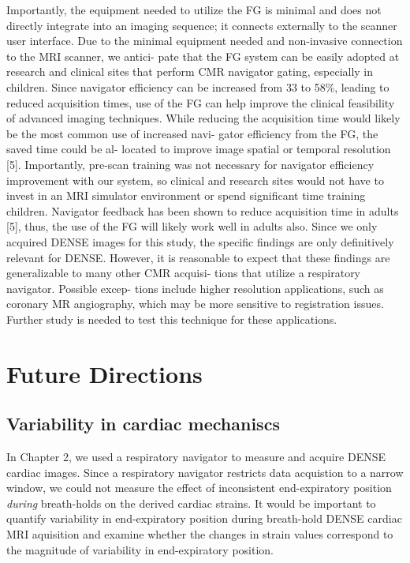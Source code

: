 	Importantly, the equipment needed to utilize the FG is minimal and does not directly integrate into an imaging sequence; it connects externally to the scanner user interface. Due to the minimal equipment needed and non-invasive connection to the MRI scanner, we antici- pate that the FG system can be easily adopted at research and clinical sites that perform CMR navigator gating, especially in children. Since navigator efficiency can be increased from 33 to 58\%, leading to reduced acquisition times, use of the FG can help improve the clinical feasibility of advanced imaging techniques. While reducing the acquisition time would likely be the most common use of increased navi- gator efficiency from the FG, the saved time could be al- located to improve image spatial or temporal resolution [5]. Importantly, pre-scan training was not necessary for navigator efficiency improvement with our system, so clinical and research sites would not have to invest in an MRI simulator environment or spend significant time training children. Navigator feedback has been shown to reduce acquisition time in adults [5], thus, the use of the FG will likely work well in adults also. Since we only acquired DENSE images for this study,
	the specific findings are only definitively relevant for DENSE. However, it is reasonable to expect that these findings are generalizable to many other CMR acquisi- tions that utilize a respiratory navigator. Possible excep- tions include higher resolution applications, such as coronary MR angiography, which may be more sensitive to registration issues. Further study is needed to test this technique for these applications.
	
\section{Future Directions}

\subsection{Variability in cardiac mechaniscs}
	In Chapter 2, we used a respiratory navigator to measure and acquire DENSE cardiac images. Since a respiratory navigator restricts data acquistion to a narrow window, we could not measure the effect of inconsistent end-expiratory position \textit{during} breath-holds on the derived cardiac strains. It would be important to quantify variability in end-expiratory position during breath-hold DENSE cardiac MRI aquisition and examine whether the changes in strain values correspond to the magnitude of variability in end-expiratory position.
	
